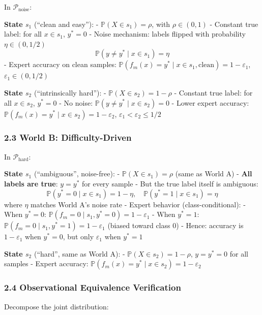 \documentclass[
  12pt,
]{ctexart}
\begin{document}
In \(\mathcal{P}_{\text{noise}}\):

\textbf{State \(s_1\)} (``clean and easy''): -
\(\mathbb{P}(X \in s_1) = \rho\), with \(\rho \in (0, 1)\) - Constant
true label: for all \(x \in s_1\), \(y^* = 0\) - Noise mechanism: labels
flipped with probability \(\eta \in (0, 1/2)\)
\[\mathbb{P}(y \neq y^* \mid x \in s_1) = \eta\] - Expert accuracy on
clean samples:
\(\mathbb{P}(f_m(x) = y^* \mid x \in s_1, \text{clean}) = 1 - \varepsilon_1\),
\(\varepsilon_1 \in (0, 1/2)\)

\textbf{State \(s_2\)} (``intrinsically hard''): -
\(\mathbb{P}(X \in s_2) = 1 - \rho\) - Constant true label: for all
\(x \in s_2\), \(y^* = 0\) - No noise:
\(\mathbb{P}(y \neq y^* \mid x \in s_2) = 0\) - Lower expert accuracy:
\(\mathbb{P}(f_m(x) = y^* \mid x \in s_2) = 1 - \varepsilon_2\),
\(\varepsilon_1 < \varepsilon_2 \leq 1/2\)

\subsubsection{2.3 World B:
Difficulty-Driven}\label{world-b-difficulty-driven}

In \(\mathcal{P}_{\text{hard}}\):

\textbf{State \(s_1\)} (``ambiguous'', noise-free): -
\(\mathbb{P}(X \in s_1) = \rho\) (same as World A) - \textbf{All labels
are true}: \(y = y^*\) for every sample - But the true label itself is
ambiguous:
\[\mathbb{P}(y^* = 0 \mid x \in s_1) = 1 - \eta, \quad \mathbb{P}(y^* = 1 \mid x \in s_1) = \eta\]
where \(\eta\) matches World A's noise rate - Expert behavior
(class-conditional): - When \(y^* = 0\):
\(\mathbb{P}(f_m = 0 \mid s_1, y^* = 0) = 1 - \varepsilon_1\) - When
\(y^* = 1\):
\(\mathbb{P}(f_m = 0 \mid s_1, y^* = 1) = 1 - \varepsilon_1\) (biased
toward class 0) - Hence: accuracy is \(1 - \varepsilon_1\) when
\(y^* = 0\), but only \(\varepsilon_1\) when \(y^* = 1\)

\textbf{State \(s_2\)} (``hard'', same as World A): -
\(\mathbb{P}(X \in s_2) = 1 - \rho\), \(y = y^* = 0\) for all samples -
Expert accuracy:
\(\mathbb{P}(f_m(x) = y^* \mid x \in s_2) = 1 - \varepsilon_2\)

\subsubsection{2.4 Observational Equivalence
Verification}\label{observational-equivalence-verification}

Decompose the joint distribution:
\end{document}
